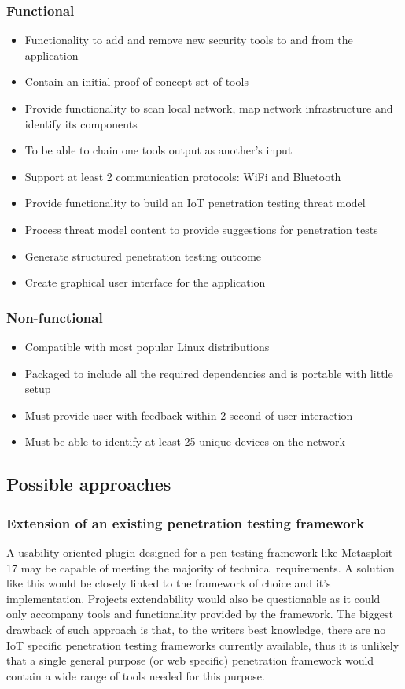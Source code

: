 	\subsubsection{Functional}
	\begin{itemize}
		\item Functionality to add and remove new security tools to and from the application
		\item Contain an initial proof-of-concept set of tools
		\item Provide functionality to scan local network, map network infrastructure and identify its components
		\item To be able to chain one tools output as another's input
		\item Support at least 2 communication protocols: WiFi and Bluetooth
		\item Provide functionality to build an IoT penetration testing threat model
		\item Process threat model content to provide suggestions for penetration tests
		\item Generate structured penetration testing outcome
		\item Create graphical user interface for the application
	\end{itemize}
	
	\subsubsection{Non-functional}
	\begin{itemize}
		\item Compatible with most popular Linux distributions
		\item Packaged to include all the required dependencies and is portable with little setup
		\item Must provide user with feedback within 2 second of user interaction
		\item Must be able to identify at least 25 unique devices on the network
	\end{itemize}


\subsection{Possible approaches}
	\subsubsection{Extension of an existing penetration testing framework}
	A usability-oriented plugin designed for a pen testing framework like Metasploit {17} may be capable of meeting the majority of technical requirements. A solution like this would be closely linked to the framework of choice and it's implementation. Projects extendability would also be questionable as it could only accompany tools and functionality provided by the framework. The biggest drawback of such approach is that, to the writers best knowledge, there are no IoT specific penetration testing frameworks currently available, thus it is unlikely that a single general purpose (or web specific) penetration framework would contain a wide range of tools needed for this purpose.
	
